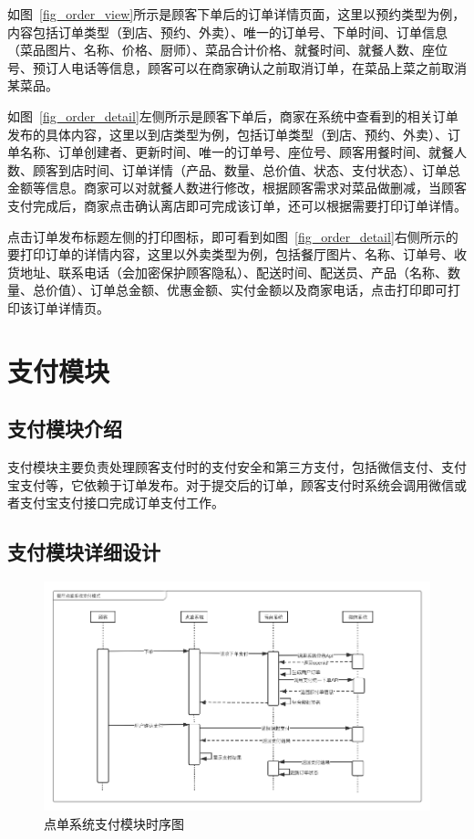 如图~\ref{fig_order_view}所示是顾客下单后的订单详情页面，这里以预约类型为例，内容包括订单类型（到店、预约、外卖）、唯一的订单号、下单时间、订单信息（菜品图片、名称、价格、厨师）、菜品合计价格、就餐时间、就餐人数、座位号、预订人电话等信息，顾客可以在商家确认之前取消订单，在菜品上菜之前取消某菜品。

如图~\ref{fig_order_detail}左侧所示是顾客下单后，商家在系统中查看到的相关订单发布的具体内容，这里以到店类型为例，包括订单类型（到店、预约、外卖）、订单名称、订单创建者、更新时间、唯一的订单号、座位号、顾客用餐时间、就餐人数、顾客到店时间、订单详情（产品、数量、总价值、状态、支付状态）、订单总金额等信息。商家可以对就餐人数进行修改，根据顾客需求对菜品做删减，当顾客支付完成后，商家点击确认离店即可完成该订单，还可以根据需要打印订单详情。

点击订单发布标题左侧的打印图标，即可看到如图~\ref{fig_order_detail}右侧所示的要打印订单的详情内容，这里以外卖类型为例，包括餐厅图片、名称、订单号、收货地址、联系电话（会加密保护顾客隐私）、配送时间、配送员、产品（名称、数量、总价值）、订单总金额、优惠金额、实付金额以及商家电话，点击打印即可打印该订单详情页。


\section{支付模块}
\subsection{支付模块介绍}
支付模块主要负责处理顾客支付时的支付安全和第三方支付，包括微信支付、支付宝支付等，它依赖于订单发布。对于提交后的订单，顾客支付时系统会调用微信或者支付宝支付接口完成订单支付工作。\\

\subsection{支付模块详细设计}
\begin{figure}[htbp!]
    \centering
    \includegraphics[width=5in]{FIGs/chapter4/pay_time.pdf}
    \caption{点单系统支付模块时序图}\label{fig_pay_time}
\end{figure}


